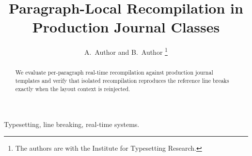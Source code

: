 \title{Paragraph-Local Recompilation in Production Journal Classes}
\author{A.~Author and B.~Author%
\thanks{The authors are with the Institute for Typesetting Research.}}
\maketitle
\begin{abstract}
We evaluate per-paragraph real-time recompilation against production
journal templates and verify that isolated recompilation reproduces the
reference line breaks exactly when the layout context is reinjected.
\end{abstract}
\begin{IEEEkeywords}
Typesetting, line breaking, real-time systems.
\end{IEEEkeywords}
